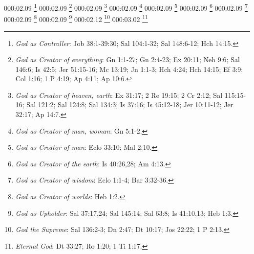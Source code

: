 000:02.09 \footnote{\textit{God as Controller}: Job 38:1-39:30; Sal 104:1-32; Sal 148:6-12; Hch 14:15.}
000:02.09 \footnote{\textit{God as Creator of everything}: Gn 1:1-27; Gn 2:4-23; Ex 20:11; Neh 9:6; Sal 146:6; Is 42:5; Jer 51:15-16; Mc 13:19; Jn 1:1-3; Hch 4:24; Hch 14:15; Ef 3:9; Col 1:16; 1 P 4:19; Ap 4:11; Ap 10:6.}
000:02.09 \footnote{\textit{God as Creator of heaven, earth}: Ex 31:17; 2 Re 19:15; 2 Cr 2:12; Sal 115:15-16; Sal 121:2; Sal 124:8; Sal 134:3; Is 37:16; Is 45:12-18; Jer 10:11-12; Jer 32:17; Ap 14:7.}
000:02.09 \footnote{\textit{God as Creator of man, woman}: Gn 5:1-2.}
000:02.09 \footnote{\textit{God as Creator of man}: Eclo 33:10; Mal 2:10.}
000:02.09 \footnote{\textit{God as Creator of the earth}: Is 40:26,28; Am 4:13.}
000:02.09 \footnote{\textit{God as Creator of wisdom}: Eclo 1:1-4; Bar 3:32-36.}
000:02.09 \footnote{\textit{God as Creator of worlds}: Heb 1:2.}
000:02.09 \footnote{\textit{God as Upholder}: Sal 37:17,24; Sal 145:14; Sal 63:8; Is 41:10,13; Heb 1:3.}
000:02.12 \footnote{\textit{God the Supreme}: Sal 136:2-3; Dn 2:47; Dt 10:17; Jos 22:22; 1 P 2:13.}
000:03.02 \footnote{\textit{Eternal God}: Dt 33:27; Ro 1:20; 1 Ti 1:17.}
